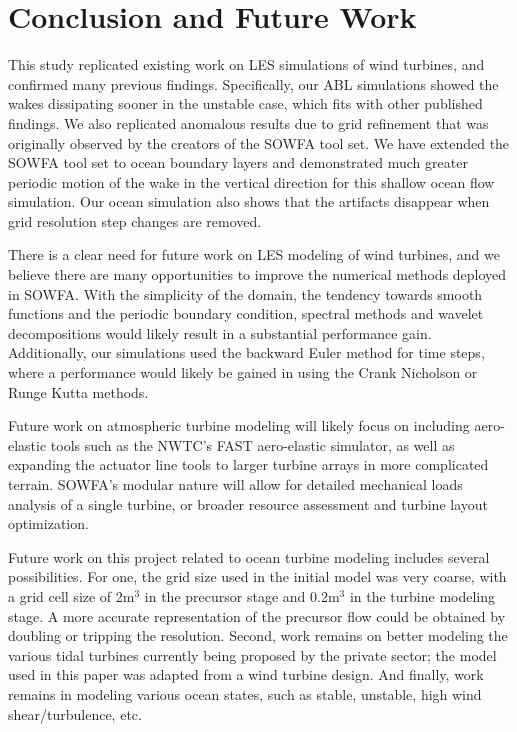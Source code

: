 \section{Conclusion and Future Work}
This study replicated existing work on LES simulations of wind turbines, and confirmed many previous findings.  Specifically, our ABL simulations showed the wakes dissipating sooner in the unstable case, which fits with other published findings.  We also replicated anomalous results due to grid refinement that was originally observed by the creators of the SOWFA tool set.  We have extended the SOWFA tool set to ocean boundary layers and demonstrated much greater periodic motion of the wake in the vertical direction for this shallow ocean flow simulation.  Our ocean simulation also shows that the artifacts disappear when grid resolution step changes are removed.

There is a clear need for future work on LES modeling of wind turbines, and we believe there are many opportunities to improve the numerical methods deployed in SOWFA.  With the simplicity of the domain, the tendency towards smooth functions and the periodic boundary condition, spectral methods and wavelet decompositions would likely result in a substantial performance gain. Additionally, our simulations used the backward Euler method for time steps, where a performance would likely be gained in using the Crank Nicholson or Runge Kutta methods.

Future work on atmospheric turbine modeling will likely focus on including aero-elastic tools such as the NWTC's FAST aero-elastic simulator, as well as expanding the actuator line tools to larger turbine arrays in more complicated terrain.  SOWFA's modular nature will allow for detailed mechanical loads analysis of a single turbine, or broader resource assessment and turbine layout optimization.

Future work on this project related to ocean turbine modeling includes several possibilities. For one, the grid size used in the initial model was very coarse, with a grid cell size of 2m$^3$ in the precursor stage and 0.2m$^3$ in the turbine modeling stage. A more accurate representation of the precursor flow could be obtained by doubling or tripping the resolution. Second, work remains on better modeling the various tidal turbines currently being proposed by the private sector; the model used in this paper was adapted from a wind turbine design. And finally, work remains in modeling various ocean states, such as stable, unstable, high wind shear/turbulence, etc.




